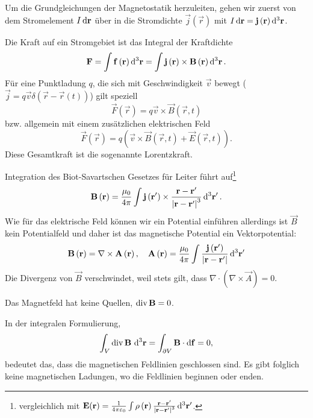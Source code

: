 Um die Grundgleichungen der Magnetostatik herzuleiten, gehen wir zuerst von dem Stromelement $I\diff \vec {r}$ über in die Stromdichte $\vec {j}\left(\vec {r}\right)$ mit $I\diff \vec {r}=\vec {j}\left(\vec {r}\right)\diff^3 \vec {r}$.

Die Kraft auf ein Stromgebiet ist das Integral der Kraftdichte
\begin{equation*}
	\vec {F}=\int \vec f\left(\vec {r}\right)\diffa[3]{\vec{r}}=\int \vec {j}\left(\vec {r}\right)\times \vec {B}\left(\vec {r}\right)\diffa[3]{\vec{r}}.
\end{equation*}
Für eine Punktladung $q$, die sich mit Geschwindigkeit $\vec {v}$ bewegt ($\vec {j}=q\vec {v}\delta \left(\vec {r}-\vec {r}\left(t\right)\right)$) gilt speziell
\begin{equation*}
	\vec F\left(\vec {r}\right)=q\vec {v}\times \vec {B}\left(\vec {r},t\right)
\end{equation*}
bzw. allgemein mit einem zusätzlichen elektrischen Feld
\begin{equation*}
	\vec F\left(\vec {r}\right)=q\left(\vec {v}\times \vec {B}\left(\vec {r},t\right)+\vec {E}\left(\vec {r},t\right)\right).
\end{equation*}
Diese Gesamtkraft ist die sogenannte Lorentzkraft.

Integration des Biot-Savartschen Gesetzes für Leiter führt auf\footnote{vergleichlich mit $\vec {E}(\vec r)=\frac{1}{4\pi \varepsilon _{0}}\int \rho \left(\vec {r}\right)\frac{\vec {r}-\vec {r}'}{\left| \vec {r}-\vec {r}'\right| ^{3}}\diffa[3]{\vec{r}'}$.}
\begin{equation*}
	\vec {B}\left(\vec {r}\right)=\frac{\mu _{0}}{4\pi }\int \vec {j}\left(\vec {r'}\right)\times \frac{\vec {r}-\vec {r}'}{\left| \vec {r}-\vec {r}'\right| ^{3}}\diffa[3]{\vec{r}'}.
\end{equation*}
Wie für das elektrische Feld können wir ein Potential einführen \textendash{} allerdings ist $\vec {B}$ kein Potentialfeld und daher ist das magnetische Potential ein Vektorpotential:
\begin{equation*}
	\vec {B}\left(\vec {r}\right)=\nabla \times \vec {A}\left(\vec {r}\right), \quad\vec {A}\left(\vec {r}\right)=\frac{\mu _{0}}{4\pi }\int \frac{\vec {j}\left(\vec {r}'\right)}{\left| \vec {r}-\vec {r}'\right| }\diffa[3]{\vec{r}'}
\end{equation*}
Die Divergenz von $\vec {B}$ verschwindet, weil stets gilt, dass $\nabla\cdot(\nabla\times \vec A) = 0$.
\begin{formal}
	Das Magnetfeld hat keine Quellen, $\divg \vec {B}=0$.
\end{formal}
In der integralen Formulierung,
\begin{equation*}
	\int _{V}\divg \vec {B}\,\diffa[3]{\vec{r}}=\int _{\partial V}\vec {B}\cdot \diff \vec {f}=0,
\end{equation*}
bedeutet das, dass die magnetischen Feldlinien geschlossen sind. Es gibt folglich keine magnetischen Ladungen, wo die Feldlinien beginnen oder enden.

